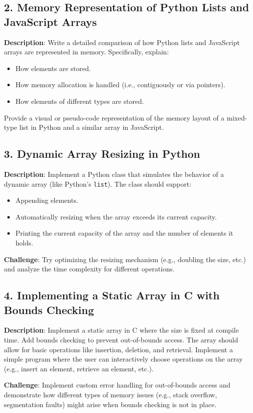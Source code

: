 \documentclass[12pt, oneside]{book}
\begin{document}
\subsection*{2. Memory Representation of Python Lists and JavaScript Arrays}
\textbf{Description}: Write a detailed comparison of how Python lists and JavaScript arrays are represented in memory. Specifically, explain:
\begin{itemize}
	\item How elements are stored.
	\item How memory allocation is handled (i.e., contiguously or via pointers).
	\item How elements of different types are stored.
\end{itemize}
Provide a visual or pseudo-code representation of the memory layout of a mixed-type list in Python and a similar array in JavaScript.

\subsection*{3. Dynamic Array Resizing in Python}
\textbf{Description}: Implement a Python class that simulates the behavior of a dynamic array (like Python’s \texttt{list}). The class should support:
\begin{itemize}
	\item Appending elements.
	\item Automatically resizing when the array exceeds its current capacity.
	\item Printing the current capacity of the array and the number of elements it holds.
\end{itemize}
\textbf{Challenge}: Try optimizing the resizing mechanism (e.g., doubling the size, etc.) and analyze the time complexity for different operations.

\subsection*{4. Implementing a Static Array in C with Bounds Checking}
\textbf{Description}: Implement a static array in C where the size is fixed at compile time. Add bounds checking to prevent out-of-bounds access. The array should allow for basic operations like insertion, deletion, and retrieval. Implement a simple program where the user can interactively choose operations on the array (e.g., insert an element, retrieve an element, etc.).

\textbf{Challenge}: Implement custom error handling for out-of-bounds access and demonstrate how different types of memory issues (e.g., stack overflow, segmentation faults) might arise when bounds checking is not in place.
\end{document}
